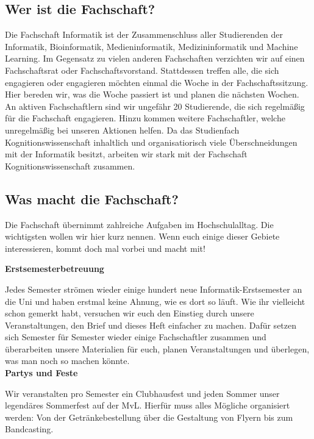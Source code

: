 \subsection{Wer ist die Fachschaft?}
Die Fachschaft Informatik ist der Zusammenschluss aller Studierenden der
Informatik, Bioinformatik, Medieninformatik, Medizininformatik und Machine Learning. 
Im Gegensatz zu vielen anderen Fachschaften verzichten wir auf einen
Fachschaftsrat oder Fachschaftsvorstand. Stattdessen treffen alle, die sich
engagieren oder engagieren möchten einmal die Woche in der Fachschaftssitzung.
Hier bereden wir, was die Woche passiert ist und planen die nächsten Wochen. An
aktiven Fachschaftlern sind wir ungefähr 20 Studierende, die sich regelmäßig
für die Fachschaft engagieren. Hinzu kommen weitere Fachschaftler, welche
unregelmäßig bei unseren Aktionen helfen. Da das Studienfach Kognitionswissenschaft inhaltlich und organisatiorisch viele
Überschneidungen mit der Informatik besitzt, arbeiten wir stark mit der Fachschaft Kognitionswissenschaft zusammen.

\subsection{Was macht die Fachschaft?}
Die Fachschaft übernimmt zahlreiche Aufgaben im Hochschulalltag. Die
wichtigsten wollen wir hier kurz nennen. Wenn euch einige dieser Gebiete
interessieren, kommt doch mal vorbei und macht mit!

\textbf{Erstsemesterbetreuung}

Jedes Semester strömen wieder einige hundert neue Informatik-Erstsemester an
die Uni und haben erstmal keine Ahnung, wie es dort so läuft. Wie ihr
vielleicht schon gemerkt habt, versuchen wir euch den Einstieg durch unsere
Veranstaltungen, den Brief und dieses Heft einfacher zu machen. Dafür setzen
sich Semester für Semester wieder einige Fachschaftler zusammen und
überarbeiten unsere Materialien für euch, planen Veranstaltungen und überlegen,
was man noch so machen könnte.\\ 

\textbf{Partys und Feste}

Wir veranstalten pro Semester ein Clubhausfest und jeden Sommer unser
legendäres Sommerfest auf der MvL. Hierfür muss alles Mögliche organisiert
werden: Von der Getränkebestellung über die Gestaltung von Flyern bis zum
Bandcasting. \\

